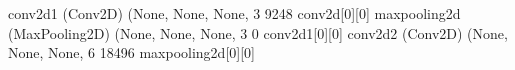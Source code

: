 \documentclass[letterpaper,10pt,english]{sphinxmanual}
\begin{document}
\begin{sphinxVerbatim}[commandchars=\\\{\}]
conv2d\PYGZus{}1 (Conv2D)               (None, None, None, 3 9248        conv2d[0][0]                     
\PYGZus{}\PYGZus{}\PYGZus{}\PYGZus{}\PYGZus{}\PYGZus{}\PYGZus{}\PYGZus{}\PYGZus{}\PYGZus{}\PYGZus{}\PYGZus{}\PYGZus{}\PYGZus{}\PYGZus{}\PYGZus{}\PYGZus{}\PYGZus{}\PYGZus{}\PYGZus{}\PYGZus{}\PYGZus{}\PYGZus{}\PYGZus{}\PYGZus{}\PYGZus{}\PYGZus{}\PYGZus{}\PYGZus{}\PYGZus{}\PYGZus{}\PYGZus{}\PYGZus{}\PYGZus{}\PYGZus{}\PYGZus{}\PYGZus{}\PYGZus{}\PYGZus{}\PYGZus{}\PYGZus{}\PYGZus{}\PYGZus{}\PYGZus{}\PYGZus{}\PYGZus{}\PYGZus{}\PYGZus{}\PYGZus{}\PYGZus{}\PYGZus{}\PYGZus{}\PYGZus{}\PYGZus{}\PYGZus{}\PYGZus{}\PYGZus{}\PYGZus{}\PYGZus{}\PYGZus{}\PYGZus{}\PYGZus{}\PYGZus{}\PYGZus{}\PYGZus{}\PYGZus{}\PYGZus{}\PYGZus{}\PYGZus{}\PYGZus{}\PYGZus{}\PYGZus{}\PYGZus{}\PYGZus{}\PYGZus{}\PYGZus{}\PYGZus{}\PYGZus{}\PYGZus{}\PYGZus{}\PYGZus{}\PYGZus{}\PYGZus{}\PYGZus{}\PYGZus{}\PYGZus{}\PYGZus{}\PYGZus{}\PYGZus{}\PYGZus{}\PYGZus{}\PYGZus{}\PYGZus{}\PYGZus{}\PYGZus{}\PYGZus{}\PYGZus{}\PYGZus{}
max\PYGZus{}pooling2d (MaxPooling2D)    (None, None, None, 3 0           conv2d\PYGZus{}1[0][0]                   
\PYGZus{}\PYGZus{}\PYGZus{}\PYGZus{}\PYGZus{}\PYGZus{}\PYGZus{}\PYGZus{}\PYGZus{}\PYGZus{}\PYGZus{}\PYGZus{}\PYGZus{}\PYGZus{}\PYGZus{}\PYGZus{}\PYGZus{}\PYGZus{}\PYGZus{}\PYGZus{}\PYGZus{}\PYGZus{}\PYGZus{}\PYGZus{}\PYGZus{}\PYGZus{}\PYGZus{}\PYGZus{}\PYGZus{}\PYGZus{}\PYGZus{}\PYGZus{}\PYGZus{}\PYGZus{}\PYGZus{}\PYGZus{}\PYGZus{}\PYGZus{}\PYGZus{}\PYGZus{}\PYGZus{}\PYGZus{}\PYGZus{}\PYGZus{}\PYGZus{}\PYGZus{}\PYGZus{}\PYGZus{}\PYGZus{}\PYGZus{}\PYGZus{}\PYGZus{}\PYGZus{}\PYGZus{}\PYGZus{}\PYGZus{}\PYGZus{}\PYGZus{}\PYGZus{}\PYGZus{}\PYGZus{}\PYGZus{}\PYGZus{}\PYGZus{}\PYGZus{}\PYGZus{}\PYGZus{}\PYGZus{}\PYGZus{}\PYGZus{}\PYGZus{}\PYGZus{}\PYGZus{}\PYGZus{}\PYGZus{}\PYGZus{}\PYGZus{}\PYGZus{}\PYGZus{}\PYGZus{}\PYGZus{}\PYGZus{}\PYGZus{}\PYGZus{}\PYGZus{}\PYGZus{}\PYGZus{}\PYGZus{}\PYGZus{}\PYGZus{}\PYGZus{}\PYGZus{}\PYGZus{}\PYGZus{}\PYGZus{}\PYGZus{}\PYGZus{}\PYGZus{}
conv2d\PYGZus{}2 (Conv2D)               (None, None, None, 6 18496       max\PYGZus{}pooling2d[0][0]              
\PYGZus{}\PYGZus{}\PYGZus{}\PYGZus{}\PYGZus{}\PYGZus{}\PYGZus{}\PYGZus{}\PYGZus{}\PYGZus{}\PYGZus{}\PYGZus{}\PYGZus{}\PYGZus{}\PYGZus{}\PYGZus{}\PYGZus{}\PYGZus{}\PYGZus{}\PYGZus{}\PYGZus{}\PYGZus{}\PYGZus{}\PYGZus{}\PYGZus{}\PYGZus{}\PYGZus{}\PYGZus{}\PYGZus{}\PYGZus{}\PYGZus{}\PYGZus{}\PYGZus{}\PYGZus{}\PYGZus{}\PYGZus{}\PYGZus{}\PYGZus{}\PYGZus{}\PYGZus{}\PYGZus{}\PYGZus{}\PYGZus{}\PYGZus{}\PYGZus{}\PYGZus{}\PYGZus{}\PYGZus{}\PYGZus{}\PYGZus{}\PYGZus{}\PYGZus{}\PYGZus{}\PYGZus{}\PYGZus{}\PYGZus{}\PYGZus{}\PYGZus{}\PYGZus{}\PYGZus{}\PYGZus{}\PYGZus{}\PYGZus{}\PYGZus{}\PYGZus{}\PYGZus{}\PYGZus{}\PYGZus{}\PYGZus{}\PYGZus{}\PYGZus{}\PYGZus{}\PYGZus{}\PYGZus{}\PYGZus{}\PYGZus{}\PYGZus{}\PYGZus{}\PYGZus{}\PYGZus{}\PYGZus{}\PYGZus{}\PYGZus{}\PYGZus{}\PYGZus{}\PYGZus{}\PYGZus{}\PYGZus{}\PYGZus{}\PYGZus{}\PYGZus{}\PYGZus{}\PYGZus{}\PYGZus{}\PYGZus{}\PYGZus{}\PYGZus{}\PYGZus{}

\end{sphinxVerbatim}
\end{document}
